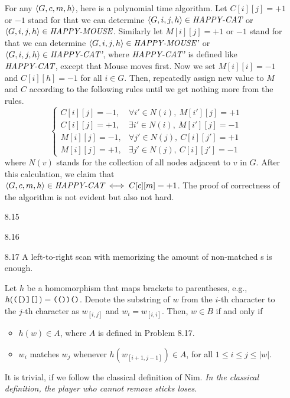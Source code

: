 \begin{itemize}
	\item[\Star 8.14]
	For any $\Bra{G, c, m, h}$, here is a polynomial time algorithm. Let $C[i][j] = +1$ or $-1$ stand for that we can determine $\Bra{G, i, j, h} \in \IT{HAPPY-CAT}$ or $\Bra{G, i, j, h} \in \IT{HAPPY-MOUSE}$. Similarly let $M[i][j] = +1$ or $-1$ stand for that we can determine $\Bra{G, i, j, h} \in \IT{HAPPY-MOUSE'}$ or $\Bra{G, i, j, h} \in \IT{HAPPY-CAT'}$, where $\IT{HAPPY-CAT'}$ is defined like $\IT{HAPPY-CAT}$, except that Mouse moves first. Now we set $M[i][i] = -1$ and $C[i][h] = -1$ for all $i \in G$. Then, repeatedly assign new value to $M$ and $C$ according to the following rules until we get nothing more from the rules.
	$$
		\left\{
			\begin{array}{ll}
				C[i][j] = -1, & \forall i' \in N(i),\ M[i'][j] = +1 \\
				C[i][j] = +1, & \exists i' \in N(i),\ M[i'][j] = -1 \\
				M[i][j] = -1, & \forall j' \in N(j),\ C[i][j'] = +1 \\
				M[i][j] = +1, & \exists j' \in N(j),\ C[i][j'] = -1
			\end{array}
		\right.
	$$
	where $N(v)$ stands for the collection of all nodes adjacent to $v$ in $G$. After this calculation, we claim that $\Bra{G, c, m, h} \in \IT{HAPPY-CAT} \iff C[c][m] = +1$. The proof of correctness of the algorithm is not evident but also not hard.
	
	\item[8.15]
	\Empty
	
	\item[8.16]
	\Empty
	
	\item[8.17]
	A left-to-right scan with memorizing the amount of non-matched \TT{(}s is enough.
	
	\item[\Star 8.18] 
	Let $h$ be a homomorphism that maps brackets to parentheses, e.g., $h(\TT{([)][]}) = \TT{(())()}$. Denote the substring of $w$ from the $i$-th character to the $j$-th character as $w_{[i,j]}$ and $w_i = w_{[i,i]}$. Then, $w \in B$ if and only if
	\begin{itemize}
		\item $h(w) \in A$, where $A$ is defined in Problem 8.17.
		\item $w_i$ matches $w_j$ whenever $h(w_{[i+1,j-1]}) \in A$, for all $1 \leq i \leq j \leq |w|$.
	\end{itemize}

	\item[\Star 8.19] 
	It is trivial, if we follow the classical definition of Nim. \emph{In the classical definition, the player who cannot remove sticks loses.}
	
\end{itemize}